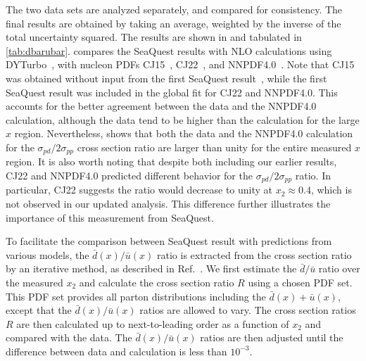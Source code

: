 \documentclass[reprint,aps,unsortedaddress,superscriptaddress,prl,floatfix,showpacs,linenumbers]{revtex4-2}
\begin{document}
The two data sets are analyzed separately, and compared for consistency.
The final results are obtained by taking an average,
weighted by the inverse of the total uncertainty squared.
The results are shown in  and tabulated in \cref{tab:dbarubar}.
 compares the SeaQuest results with
NLO calculations using DYTurbo~\cite{camarda2020},
with nucleon PDFs CJ15~\cite{accardi2016a}, CJ22~\cite{accardi2023}, and NNPDF4.0~\cite{ball2022a}.
Note that CJ15 was obtained without input from the first 
SeaQuest result~\cite{dove2021}, while the first SeaQuest result was included 
in the global fit for CJ22 and NNPDF4.0. This accounts for the better agreement between
the data and the NNPDF4.0 calculation, although the data tend to be higher than
the calculation for the large $x$ region. Nevertheless, 
shows that both the data and the NNPDF4.0 calculation for the  
$\sigma_{pd}/2\sigma_{pp}$ cross section ratio are larger than unity for the
entire measured $x$ region. 
It is also worth noting that despite both including our earlier results,
CJ22 and NNPDF4.0 predicted different behavior for the $\sigma_{pd}/2\sigma_{pp}$ ratio.
In particular, CJ22 suggests the ratio would decrease to unity at $x_2\approx0.4$,
which is not observed in our updated analysis. 
This difference further illustrates the importance of this measurement from SeaQuest.

To facilitate the comparison between SeaQuest result with predictions 
from various models, the $\bar{d}(x)/\bar{u}(x)$ ratio is extracted from the 
cross section ratio by an iterative method, as described in 
Ref.~\cite{dove2021}.
We first estimate the $\bar{d}/\bar{u}$ ratio over the measured $x_2$
and calculate the cross section ratio $R$ using a chosen PDF set.
This PDF set provides all parton distributions including the
$\bar{d}(x)+\bar{u}(x)$, except that the $\bar{d}(x)/\bar{u}(x)$ 
ratios are allowed to vary.
The cross section ratios $R$ are then calculated up to next-to-leading order
as a function of $x_2$ and compared with the data. The $\bar{d}(x)/\bar{u}(x)$ 
ratios are then adjusted until the difference between data and
calculation is less than $10^{-3}$.
\end{document}
